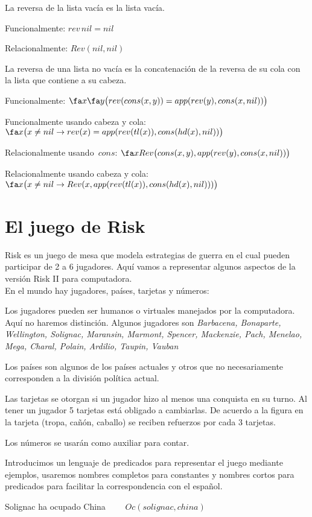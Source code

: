 \documentclass[11pt,letterpaper]{article}
\begin{document}
 \item La reversa de la lista vacía es la lista vacía.
 \bi
  \item Funcionalmente: $ rev\,nil=nil $
  \item Relacionalmente: $ Rev(nil,nil) $
 \ei
 
 \item La reversa de una lista no vacía es la concatenación de la
  reversa de su cola con la lista que contiene a su cabeza.
 \bi
  \item Funcionalmente: 
    $\fa x\fa y \big(rev(cons(x,y))=app(rev(y),cons(x,nil))\big)$
  \item Funcionalmente usando cabeza y cola:
    $\fa x\big(x\neq nil \to rev(x)=app(rev(tl(x)),cons(hd(x),nil))\big)$
  \item Relacionalmente usando~$cons$:
    $ \fa x Rev\big(cons(x,y),app(rev(y),cons(x,nil))\big) $
  \item Relacionalmente usando cabeza y cola:
    $\fa x \big(x\neq nil\to Rev(x,app(rev(tl(x)),cons(hd(x),nil)))\big)$
 \ei
\ei

  
\section{El juego de Risk}

Risk es un juego de mesa que modela estrategias de guerra en el cual pueden 
participar de 2 a 6 jugadores. Aquí vamos a representar algunos aspectos de la
versión Risk II para computadora. \\
En el mundo hay jugadores, pa\'ises, tarjetas y n\'umeros:
\bi
 \item Los jugadores pueden ser humanos o virtuales manejados por la
  computadora. Aquí no haremos distinción. Algunos jugadores son
  \textit{Barbacena, Bonaparte, Wellington, Solignac, Maransin, Marmont,
  Spencer, Mackenzie, Pach, Menelao, Mega, Charal, Polain, Ardilio, Taupin, 
  Vauban}
 \item Los pa\'ises son algunos de los pa\'ises actuales y otros que no 
  necesariamente corresponden a la división política actual.
 \item Las tarjetas se otorgan si un jugador hizo al menos una conquista en 
  su turno. Al tener un jugador 5 tarjetas está obligado a cambiarlas. De 
  acuerdo a la figura en la tarjeta (tropa, cañ\'on, caballo) se reciben 
  refuerzos por cada 3 tarjetas.
 \item Los números se usarán como auxiliar para contar.
\ei

Introducimos un lenguaje de predicados para representar el juego
mediante ejemplos, usaremos nombres completos para constantes y
nombres cortos para predicados para facilitar la correspondencia con
el español.
\bi
 \item Solignac ha ocupado China   $\qquad  Oc(solignac,china)$
\end{document}

